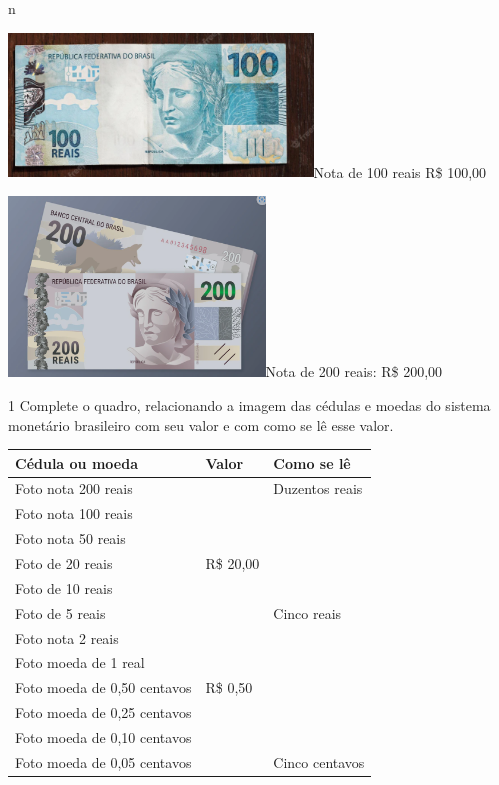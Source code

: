 {%
n

\includegraphics[width=3.18285in,height=1.50833in]{./media/image70.png}Nota
de 100 reais R\$ 100,00


\includegraphics[width=2.68333in,height=1.88913in]{./media/image71.png}Nota
de 200 reais: R\$ 200,00
}


\num{1} Complete o quadro, relacionando a imagem das cédulas e moedas do
sistema monetário brasileiro com seu valor e com como se lê esse valor.


\begin{longtable}[]{@{}lll@{}}
\toprule
Cédula ou moeda & Valor & Como se lê\tabularnewline
\midrule
\endhead
Foto nota 200 reais & & Duzentos reais\tabularnewline
Foto nota 100 reais & &\tabularnewline
Foto nota 50 reais & &\tabularnewline
Foto de 20 reais & R\$ 20,00 &\tabularnewline
Foto de 10 reais & &\tabularnewline
Foto de 5 reais & & Cinco reais\tabularnewline
Foto nota 2 reais & &\tabularnewline
Foto moeda de 1 real & &\tabularnewline
Foto moeda de 0,50 centavos & R\$ 0,50 &\tabularnewline
Foto moeda de 0,25 centavos & &\tabularnewline
Foto moeda de 0,10 centavos & &\tabularnewline
Foto moeda de 0,05 centavos & & Cinco centavos\tabularnewline
\bottomrule
\end{longtable}

